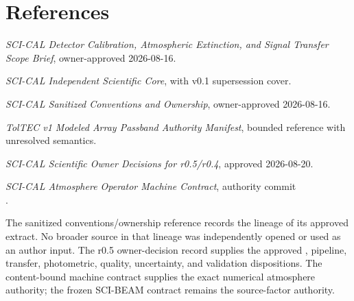 \documentclass[11pt]{article}
\begin{document}
\section*{References}
\begin{enumerate}[label={[\arabic*]},leftmargin=*]
\item \emph{SCI-CAL Detector Calibration, Atmospheric Extinction, and Signal Transfer Scope Brief}, owner-approved 2026-08-16.
\item \emph{SCI-CAL Independent Scientific Core}, with v0.1 supersession cover.
\item \emph{SCI-CAL Sanitized Conventions and Ownership}, owner-approved 2026-08-16.
\item \emph{TolTEC v1 Modeled Array Passband Authority Manifest}, bounded reference with unresolved semantics.
\item \emph{SCI-CAL Scientific Owner Decisions for r0.5/r0.4}, approved 2026-08-20.
\item \emph{SCI-CAL Atmosphere Operator Machine Contract}, authority commit\\
.
\end{enumerate}
The sanitized conventions/ownership reference records the lineage of its
approved extract. No broader source in that lineage was independently opened
or used as an author input.
The r0.5 owner-decision record supplies the approved , pipeline,
transfer, photometric, quality, uncertainty, and validation dispositions. The
content-bound machine contract supplies the exact numerical atmosphere
authority; the frozen SCI-BEAM contract remains the source-factor authority.

\clearpage\appendix
\end{document}
